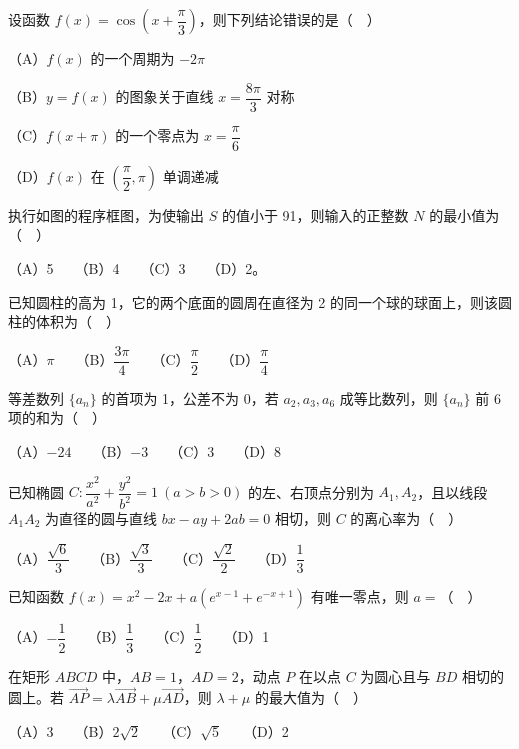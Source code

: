 \begin{question}
设函数 \(f(x)=\cos\left(x+\dfrac\pi3\right)\)，则下列结论错误的是（　）

   （A）\(f(x)\) 的一个周期为 \(-2\pi\)

   （B）\(y=f(x)\) 的图象关于直线 \(x=\dfrac{8\pi}{3}\) 对称

   （C）\(f(x+\pi)\) 的一个零点为 \(x=\dfrac\pi6\)

   （D）\(f(x)\) 在 \(\left(\dfrac\pi2,\pi\right)\) 单调递减

\Needspace{0.4\textheight}
\end{question}
\begin{question}
执行如图的程序框图，为使输出 \(S\) 的值小于 91，则输入的正整数 \(N\) 的最小值为（　）
\nopagebreak[4]
\begin{center}\end{center}
\nopagebreak[4]
   （A）5　　（B）4　　（C）3　　（D）2。

\end{question}
\begin{question}
已知圆柱的高为 1，它的两个底面的圆周在直径为 2 的同一个球的球面上，则该圆柱的体积为（　）

   （A）\(\pi\)　　（B）\(\dfrac{3\pi}{4}\)　　（C）\(\dfrac\pi2\)　　（D）\(\dfrac\pi4\)

\end{question}
\begin{question}
等差数列 \(\{a_n\}\) 的首项为 1，公差不为 0，若 \(a_2,a_3,a_6\) 成等比数列，则 \(\{a_n\}\) 前 6 项的和为（　）

   （A）\(-24\)　　（B）\(-3\)　　（C）3　　（D）8

\end{question}
\begin{question}
已知椭圆 \(C:\dfrac{x^2}{a^2}+\dfrac{y^2}{b^2}=1\ (a>b>0)\) 的左、右顶点分别为 \(A_1,A_2\)，且以线段 \(A_1A_2\) 为直径的圆与直线 \(bx-ay+2ab=0\) 相切，则 \(C\) 的离心率为（　）

   （A）\(\dfrac{\sqrt6}{3}\)　　（B）\(\dfrac{\sqrt3}{3}\)　　（C）\(\dfrac{\sqrt2}{2}\)　　（D）\(\dfrac13\)

\end{question}
\begin{question}
已知函数 \(f(x)=x^2-2x+a\left(e^{x-1}+e^{-x+1}\right)\) 有唯一零点，则 \(a=\)（　）

   （A）\(-\dfrac12\)　　（B）\(\dfrac13\)　　（C）\(\dfrac12\)　　（D）1

\end{question}
\begin{question}
在矩形 \(ABCD\) 中，\(AB=1\)，\(AD=2\)，动点 \(P\) 在以点 \(C\) 为圆心且与 \(BD\) 相切的圆上。若 \(\overrightarrow{AP}=\lambda\overrightarrow{AB}+\mu\overrightarrow{AD}\)，则 \(\lambda+\mu\) 的最大值为（　）

   （A）3　　（B）\(2\sqrt2\)　　（C）\(\sqrt5\)　　（D）2

\end{question}

